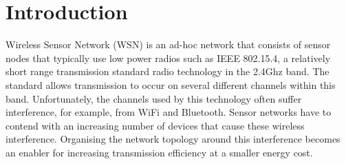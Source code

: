 \section{Introduction}
\label{sec:introduction}
Wireless Sensor Network (WSN) is an ad-hoc network that consists of sensor nodes that typically use low power radios such as IEEE 802.15.4, a relatively short range transmission standard radio technology in the 2.4Ghz band. The standard allows transmission to occur on several different channels within this band. Unfortunately, the channels used by this technology often suffer interference, for example, from WiFi and Bluetooth. Sensor networks have to contend with an increasing number of devices that cause these wireless interference. Organising the network topology around this interference becomes an enabler for increasing transmission efficiency at a smaller energy cost. %



